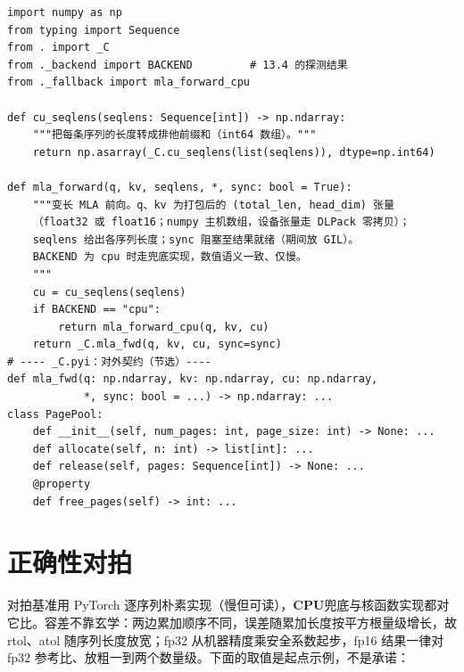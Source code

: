 \documentclass[12pt,a4paper,fontset=fandol]{ctexbook}
\newcommand{\Dom}[1]{\textsf{\bfseries #1}}
\newcommand{\CPU}{\Dom{CPU}}
\begin{document}
\begin{lstlisting}[style=pythonstyle,caption={\_\_init\_\_.py 与 \_C.pyi（节选）：签名对后端零感知}]
import numpy as np
from typing import Sequence
from . import _C
from ._backend import BACKEND         # 13.4 的探测结果
from ._fallback import mla_forward_cpu

def cu_seqlens(seqlens: Sequence[int]) -> np.ndarray:
    """把每条序列的长度转成排他前缀和（int64 数组）。"""
    return np.asarray(_C.cu_seqlens(list(seqlens)), dtype=np.int64)

def mla_forward(q, kv, seqlens, *, sync: bool = True):
    """变长 MLA 前向。q、kv 为打包后的 (total_len, head_dim) 张量
    （float32 或 float16；numpy 主机数组，设备张量走 DLPack 零拷贝）；
    seqlens 给出各序列长度；sync 阻塞至结果就绪（期间放 GIL）。
    BACKEND 为 cpu 时走兜底实现，数值语义一致、仅慢。
    """
    cu = cu_seqlens(seqlens)
    if BACKEND == "cpu":
        return mla_forward_cpu(q, kv, cu)
    return _C.mla_fwd(q, kv, cu, sync=sync)
# ---- _C.pyi：对外契约（节选）----
def mla_fwd(q: np.ndarray, kv: np.ndarray, cu: np.ndarray,
            *, sync: bool = ...) -> np.ndarray: ...
class PagePool:
    def __init__(self, num_pages: int, page_size: int) -> None: ...
    def allocate(self, n: int) -> list[int]: ...
    def release(self, pages: Sequence[int]) -> None: ...
    @property
    def free_pages(self) -> int: ...
\end{lstlisting}

\section{正确性对拍}

对拍基准用 PyTorch 逐序列朴素实现（慢但可读），\CPU{}兜底与核函数实现都对它比。容差不靠玄学：两边累加顺序不同，误差随累加长度按平方根量级增长，故 rtol、atol 随序列长度放宽；fp32 从机器精度乘安全系数起步，fp16 结果一律对 fp32 参考比、放粗一到两个数量级。下面的取值是起点示例，不是承诺：
\end{document}
